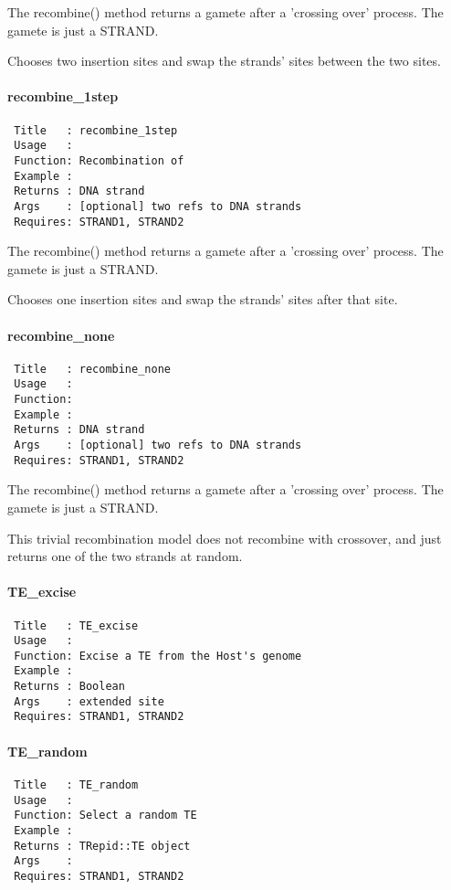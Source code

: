 The recombine() method returns a gamete after a 'crossing over'
process. The gamete is just a STRAND.



Chooses two insertion sites and swap the strands' sites between the two sites.

\paragraph*{recombine\_1step\label{recombine_1step}}
\begin{verbatim}
 Title   : recombine_1step
 Usage   : 
 Function: Recombination of 
 Example : 
 Returns : DNA strand
 Args    : [optional] two refs to DNA strands
 Requires: STRAND1, STRAND2
\end{verbatim}


The recombine() method returns a gamete after a 'crossing over'
process. The gamete is just a STRAND.



Chooses one insertion sites and swap the strands' sites after that site.

\paragraph*{recombine\_none\label{recombine_none}}
\begin{verbatim}
 Title   : recombine_none
 Usage   : 
 Function: 
 Example : 
 Returns : DNA strand
 Args    : [optional] two refs to DNA strands
 Requires: STRAND1, STRAND2
\end{verbatim}


The recombine() method returns a gamete after a 'crossing over'
process. The gamete is just a STRAND.



This trivial recombination model does not recombine with crossover,
and just returns one of the two strands at random.

\paragraph*{TE\_excise\label{TE_excise}}
\begin{verbatim}
 Title   : TE_excise
 Usage   :
 Function: Excise a TE from the Host's genome
 Example :
 Returns : Boolean
 Args    : extended site
 Requires: STRAND1, STRAND2
\end{verbatim}
\paragraph*{TE\_random\label{TE_random}}
\begin{verbatim}
 Title   : TE_random
 Usage   : 
 Function: Select a random TE
 Example : 
 Returns : TRepid::TE object
 Args    : 
 Requires: STRAND1, STRAND2
\end{verbatim}


